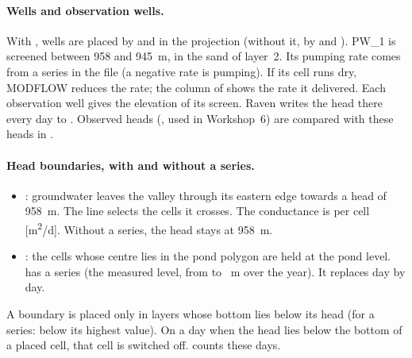 \paragraph{Wells and observation wells.}
With , wells are placed by  and  in the projection (without it, by  and
). PW\_1 is screened between 958 and 945~m, in the sand of layer~2. Its pumping rate comes from a
 series in the  file (a negative rate is pumping). If its cell runs dry, MODFLOW reduces the
rate; the column  of  shows the rate it delivered. Each observation well gives the
elevation of its screen. Raven writes the head there every day to . Observed heads
(, used in Workshop~6) are compared with these heads in .

\paragraph{Head boundaries, with and without a series.}
\begin{itemize}
\item {}: groundwater leaves the
  valley through its eastern edge towards a head of 958~m. The line selects the cells it crosses. The conductance is per
  cell [m\textsuperscript{2}/d]. Without a  series, the head stays at 958~m.
\item {}: the cells whose centre lies in the pond polygon
  are held at the pond level.  has a  series (the measured level, from
   to ~m over the year). It replaces  day by day.
\end{itemize}
A boundary is placed only in layers whose bottom lies below its head (for a series: below its highest value). On a day when
the head lies below the bottom of a placed cell, that cell is switched off.  counts these days.
